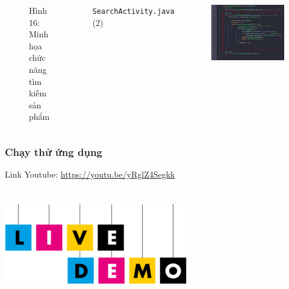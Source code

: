 \documentclass{beamer}
\begin{document}
\begin{frame}
\begin{columns}
\begin{figure}
            \caption{\centering\tiny{Hình 16: Minh họa chức năng tìm kiếm sản phẩm}}
        \end{figure}
        \indent \texttt{SearchActivity.java} (2)
        \begin{figure}
            \centering
            \includegraphics[width=\textwidth]{images/51.png}
        \end{figure}
    \end{columns}
\end{frame}

\begin{frame}
    \frametitle{Chạy thử ứng dụng}
    \begin{center}
        \Large{Link Youtube: \href{https://youtu.be/yRglZ4Segkk}{\color{blue} https://youtu.be/yRglZ4Segkk}}\\
        ~\\
        ~\\
        \includegraphics[width=0.6\textwidth]{images/demo.png}
    \end{center}
\end{frame}
\end{document}
